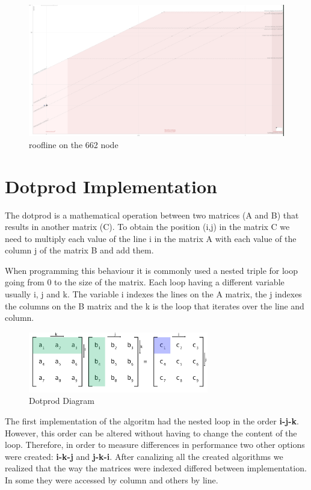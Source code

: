 \documentclass[a4paper]{report}
\begin{document}
\begin{figure}[H]
    \centering
        \includegraphics[width=\textwidth]{images/roofline_cluster.png}
        \caption{roofline on the 662 node}
\end{figure}

\chapter{Dotprod Implementation}
The dotprod is a mathematical operation between two matrices (A and B) that
results in another matrix (C). To obtain the position (i,j) in the matrix C we
need to multiply each value of the line i in the matrix A with each value of the
column j of the matrix B and add them.

When programming this behaviour it is commonly used a nested triple for loop
going from 0 to the size of the matrix. Each loop having a different variable
usually i, j and k. The variable i indexes the lines on the A matrix, the j
indexes the columns on the B matrix and the k is the loop that iterates over the
line and column.

\begin{figure}[H]
    \centering
        \includegraphics[width=0.7\textwidth]{images/matrix_mult.png}
        \caption{Dotprod Diagram}
\end{figure}

The first implementation of the algoritm had the nested loop in the order
\textbf{i-j-k}. However, this order can be altered without having to change the
content of the loop. Therefore, in order to measure differences in performance
two other options were created: \textbf{i-k-j} and \textbf{j-k-i}. After
canalizing all the created algorithms we realized that the way the matrices were
indexed differed between implementation. In some they were accessed by column
and others by line.
\end{document}
